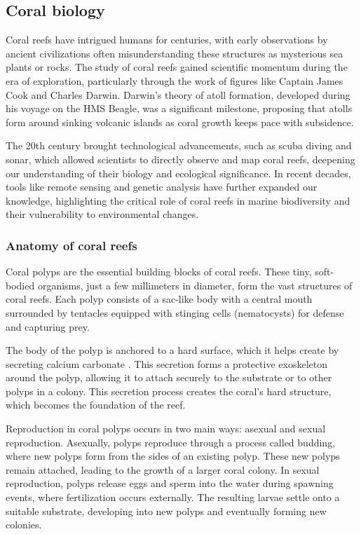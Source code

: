 \subsection{Coral biology}
\label{sec:state-of-the-art_biology}

Coral reefs have intrigued humans for centuries, with early observations by ancient civilizations often misunderstanding these structures as mysterious sea plants or rocks. The study of coral reefs gained scientific momentum during the era of exploration, particularly through the work of figures like Captain James Cook and Charles Darwin. Darwin's theory of atoll formation, developed during his voyage on the HMS Beagle, was a significant milestone, proposing that atolls form around sinking volcanic islands as coral growth keeps pace with subsidence.

The 20th century brought technological advancements, such as scuba diving and sonar, which allowed scientists to directly observe and map coral reefs, deepening our understanding of their biology and ecological significance. In recent decades, tools like remote sensing and genetic analysis have further expanded our knowledge, highlighting the critical role of coral reefs in marine biodiversity and their vulnerability to environmental changes.

\subsubsection{Anatomy of coral reefs}


Coral polyps are the essential building blocks of coral reefs. These tiny, soft-bodied organisms, just a few millimeters in diameter, form the vast structures of coral reefs. Each polyp consists of a sac-like body with a central mouth surrounded by tentacles equipped with stinging cells (nematocysts) for defense and capturing prey.

The body of the polyp is anchored to a hard surface, which it helps create by secreting calcium carbonate . This secretion forms a protective exoskeleton around the polyp, allowing it to attach securely to the substrate or to other polyps in a colony. This secretion process creates the coral's hard structure, which becomes the foundation of the reef.

Reproduction in coral polyps occurs in two main ways: asexual and sexual reproduction. Asexually, polyps reproduce through a process called budding, where new polyps form from the sides of an existing polyp. These new polyps remain attached, leading to the growth of a larger coral colony. In sexual reproduction, polyps release eggs and sperm into the water during spawning events, where fertilization occurs externally. The resulting larvae settle onto a suitable substrate, developing into new polyps and eventually forming new colonies.

